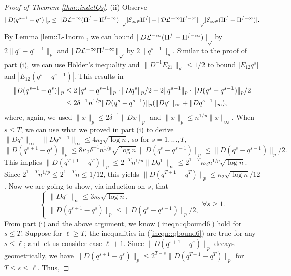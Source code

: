\documentclass[12pt]{article}%
\theoremstyle{plain}%
\theoremstyle{remark}
\begin{document}
\begin{proof}[Proof of Theorem \ref{thm::indctQs}]
(ii) Observe 
\begin{equation*}
\| D(q^{s+1} - q^s) \|_p \le \| D \cal{L}^{-1} (q^s - q^{s-1}) \|_p | E_{12}q^s| + \| D \cal{L}^{-1}q^{s-1}\|_p | E_{12} (q^s - q^{s-1}) |.
\end{equation*}
By Lemma \ref{lem::L-1norm}, we can bound $\| D \cal{L}^{-1} (q^s - q^{s-1}) \|_p$ by $2\|q^s - q^{s-1} \|_p$ and $\| D \cal{L}^{-1}q^{s-1}\|_p$ by $2 \|q^{s-1}\|_p$. Similar to the proof of part (i), we can use H\"{o}lder's inequality and $\| D^{-1} E_{21} \|_{p'} \le 1/2$ to bound $| E_{12}q^s|$ and $| E_{12} (q^s - q^{s-1}) |$. This results in
\begin{align}
\| D(q^{s+1} - q^s) \|_p &\le 2\| q^s - q^{s-1} \|_p  \cdot \| Dq^s \|_p/2 + 2\| q^{s-1} \|_p \cdot \|  D(q^s - q^{s-1}) \|_p/2 \notag\\
&\le 2\delta^{-1} n^{1/p} \|  D(q^s - q^{s-1}) \|_p (\| Dq^s \|_\infty + \| Dq^{s-1}\|_\infty), \label{ineqn::qbound5-2}
\end{align}
where, again, we used $\| x \|_p \le 2\delta^{-1} \|Dx\|_p$ and $\| x \|_p \le n^{1/p} \|x \|_\infty$. When $s\le T$, we can use what we proved in part (i) to derive $\| Dq^s \|_\infty + \| Dq^{s-1}\|_\infty \le 4\kappa_2\sqrt{\log n}$, so for $s=1,\ldots, T$, 
\begin{equation*}
\| D(q^{s+1} - q^s) \|_p \le 8\kappa_2\delta^{-1} n^{1/p}\sqrt{\log n}\,  \|  D(q^s - q^{s-1}) \|_p \le \|  D(q^s - q^{s-1}) \|_p/2.
\end{equation*}
This implies $\| D(q^{T+1} - q^T) \|_p \le 2^{-T} n^{1/p} \| Dq^1\|_\infty \le 2^{1-T} \kappa_2 n^{1/p} \sqrt{\log n}$. Since $2^{1-T} n^{1/p} \le 2^{1-T} n \le 1/12$, this yields $\| D(q^{T+1} - q^T) \|_p \le \kappa_2 \sqrt{\log n}/12$. Now we are going to show, via induction on $s$, that 
\begin{equation}
\begin{cases}
\| Dq^s \|_{\infty} \le 3\kappa_2 \sqrt{\log n}, \\
\| D(q^{s+1} - q^s) \|_p \le \|  D(q^s - q^{s-1}) \|_p/2,
\end{cases}
\forall s \ge 1. \label{ineqn::qbound6}
\end{equation}
From part (i) and the above argument, we know (\ref{ineqn::qbound6}) hold for $s \le T$. Suppose for $\ell \ge T$, the inequalities in (\ref{ineqn::qbound6}) are true for any $s \le \ell$; and let us consider case $\ell + 1$. Since $\| D(q^{s+1} - q^s) \|_p$ decays geometrically, we have $\| D(q^{s+1} - q^s) \|_p \le 2^{T-s} \| D(q^{T+1} - q^T) \|_p$ for $T \le s \le \ell$. Thus,

\end{proof}
\end{document}

